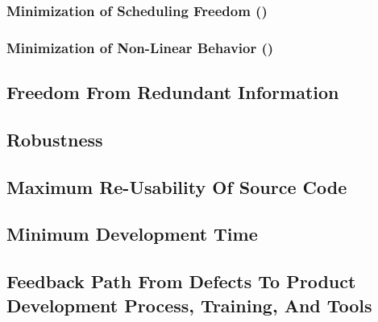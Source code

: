 \subsubsection[Minimization of Scheduling Freedom]
              {Minimization of Scheduling Freedom 
              ()}
\label{chgr0:sdda0:mpc0:msf0}


\subsubsection[Minimization of Non-Linear Behavior]
              {Minimization of Non-Linear Behavior
              ()}
\label{chgr0:sdda0:mpc0:mnl0}


\subsection{Freedom From Redundant Information}


\subsection{Robustness}
\label{chgr0:sdda0:srob0}


\subsection{Maximum Re-Usability Of Source Code}


\subsection{Minimum Development Time}


\subsection{Feedback Path From Defects To Product Development Process, Training, And Tools}


